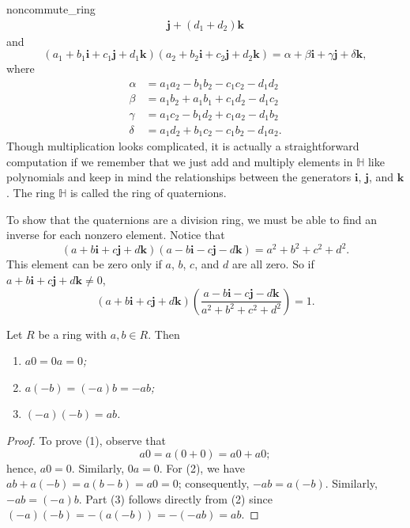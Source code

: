 \begin{example}{noncommute_ring}
\begin{multline*}
{\mathbf j} + ( d_1 + d_2) {\mathbf k}
\end{multline*}
and
\[
(a_1 + b_1 {\mathbf i}  + c_1 {\mathbf j} +d_1 {\mathbf k} ) ( a_2 + b_2
{\mathbf i}  + c_2 {\mathbf j} +d_2 {\mathbf k} ) = \alpha + \beta {\mathbf
i}  + \gamma {\mathbf j} + \delta {\mathbf k},
\]
where
\begin{align*}
\alpha & =  a_1 a_2 - b_1 b_2 - c_1 c_2 -d_1 d_2 \\
\beta & =  a_1 b_2 + a_1 b_1 + c_1 d_2 - d_1 c_2 \\
\gamma & =  a_1 c_2 - b_1 d_2 + c_1 a_2 - d_1 b_2 \\
\delta & =  a_1 d_2 + b_1 c_2 - c_1 b_2 - d_1 a_2.
\end{align*}
Though multiplication looks complicated, it is actually a
straightforward computation if we remember that we just add and
multiply elements in ${\mathbb H}$ like polynomials and keep in mind the
relationships between the generators ${\mathbf i}$, ${\mathbf j}$, and
${\mathbf k}$. The ring ${\mathbb H}$ is called the ring of {\bfi
quaternions}.
 
 
To show that the quaternions are a division ring, we must be able to
find an inverse for each nonzero element. Notice that 
\[
( a + b {\mathbf i}  + c {\mathbf j} +d {\mathbf k} )( a - b
{\mathbf i}  - c {\mathbf j}
-d {\mathbf k} ) = a^2 + b^2 + c^2 + d^2.
\]
This element can be zero only if $a$, $b$, $c$, and $d$ are
all zero. So if $a + b {\mathbf i}  + c {\mathbf j} +d {\mathbf k}
\neq 0$,
\[
( a + b {\mathbf i}  + c {\mathbf j} +d {\mathbf k} )
\left(
\frac{a - b {\mathbf i} - c {\mathbf j} - d {\mathbf k} }{ a^2 + b^2 + c^2
+ d^2 }
\right)
= 1.
\]
\end{example}
 
 
\begin{proposition}
Let $R$ be a ring with $a, b \in R$. Then
\begin{enumerate}
 
\rm \item \it
$a0 = 0a = 0$;
 
\rm \item \it
$a(-b) = (-a)b = -ab$;
 
\rm \item \it
$(-a)(-b) =ab$.
 
\end{enumerate}
\end{proposition}
 
 
\begin{proof}
To prove (1), observe that
\[
a0 = a(0+0)= a0+ a0;
\]
hence, $a0=0$. Similarly, $0a = 0$. For (2), we have $ab + a(-b) =
a(b-b) = a0 = 0$; consequently, $-ab = a(-b)$. Similarly, $-ab =
(-a)b$. Part (3) follows directly from (2) since $(-a)(-b) = -(a(- b))
= -(-ab) = ab$. 
\end{proof}
 

